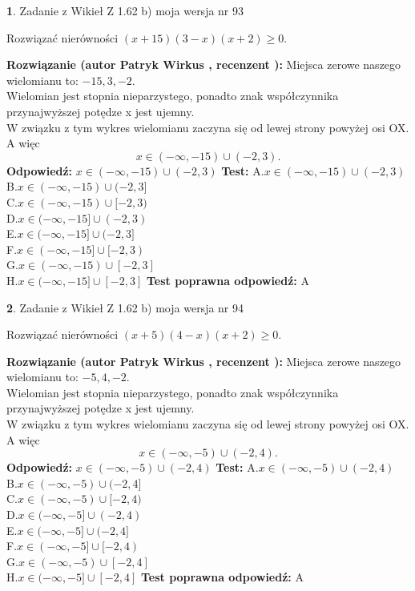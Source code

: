 \documentclass[12pt, a4paper]{article}
\theoremstyle{definition} %
\newtheorem{zad}{}
\newcommand{\zadStart}[1]{\begin{zad}#1\newline}
\newcommand{\zadStop}{\end{zad}}
\newcommand{\rozwStart}[2]{\noindent \textbf{Rozwiązanie (autor #1 , recenzent #2): }\newline}
\newcommand{\rozwStop}{\newline}
\newcommand{\odpStart}{\noindent \textbf{Odpowiedź:}\newline}
\newcommand{\odpStop}{\newline}
\newcommand{\testStart}{\noindent \textbf{Test:}\newline}
\newcommand{\testStop}{\newline}
\newcommand{\kluczStart}{\noindent \textbf{Test poprawna odpowiedź:}\newline}
\newcommand{\kluczStop}{\newline}
\begin{document}
\zadStart{Zadanie z Wikieł Z 1.62 b) moja wersja nr 93}

Rozwiązać nierówności $(x+15)(3-x)(x+2)\ge0$.
\zadStop
\rozwStart{Patryk Wirkus}{}
Miejsca zerowe naszego wielomianu to: $-15, 3, -2$.\\
Wielomian jest stopnia nieparzystego, ponadto znak współczynnika przy\linebreak najwyższej potędze x jest ujemny.\\ W związku z tym wykres wielomianu zaczyna się od lewej strony powyżej osi OX. A więc $$x \in (-\infty,-15) \cup (-2,3).$$
\rozwStop
\odpStart
$x \in (-\infty,-15) \cup (-2,3)$
\odpStop
\testStart
A.$x \in (-\infty,-15) \cup (-2,3)$\\
B.$x \in (-\infty,-15) \cup (-2,3]$\\
C.$x \in (-\infty,-15) \cup [-2,3)$\\
D.$x \in (-\infty,-15] \cup (-2,3)$\\
E.$x \in (-\infty,-15] \cup (-2,3]$\\
F.$x \in (-\infty,-15] \cup [-2,3)$\\
G.$x \in (-\infty,-15) \cup [-2,3]$\\
H.$x \in (-\infty,-15] \cup [-2,3]$
\testStop
\kluczStart
A
\kluczStop



\zadStart{Zadanie z Wikieł Z 1.62 b) moja wersja nr 94}

Rozwiązać nierówności $(x+5)(4-x)(x+2)\ge0$.
\zadStop
\rozwStart{Patryk Wirkus}{}
Miejsca zerowe naszego wielomianu to: $-5, 4, -2$.\\
Wielomian jest stopnia nieparzystego, ponadto znak współczynnika przy\linebreak najwyższej potędze x jest ujemny.\\ W związku z tym wykres wielomianu zaczyna się od lewej strony powyżej osi OX. A więc $$x \in (-\infty,-5) \cup (-2,4).$$
\rozwStop
\odpStart
$x \in (-\infty,-5) \cup (-2,4)$
\odpStop
\testStart
A.$x \in (-\infty,-5) \cup (-2,4)$\\
B.$x \in (-\infty,-5) \cup (-2,4]$\\
C.$x \in (-\infty,-5) \cup [-2,4)$\\
D.$x \in (-\infty,-5] \cup (-2,4)$\\
E.$x \in (-\infty,-5] \cup (-2,4]$\\
F.$x \in (-\infty,-5] \cup [-2,4)$\\
G.$x \in (-\infty,-5) \cup [-2,4]$\\
H.$x \in (-\infty,-5] \cup [-2,4]$
\testStop
\kluczStart
A
\kluczStop
\end{document}
